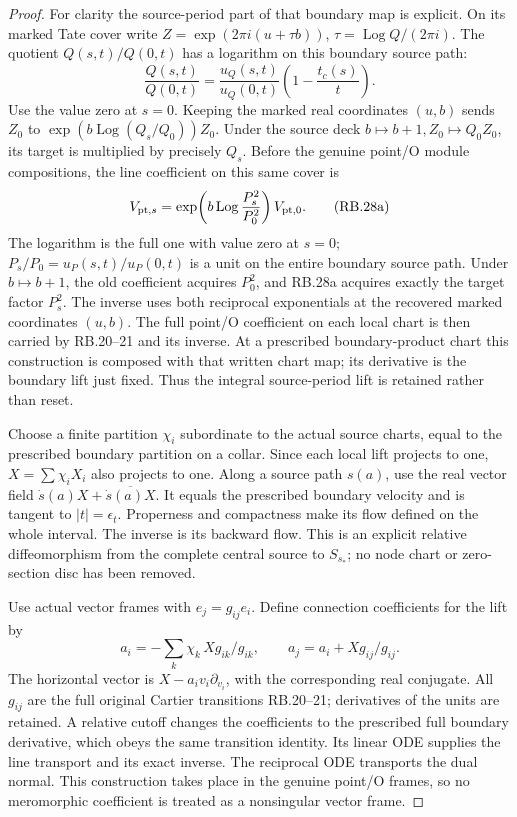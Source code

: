 \begin{proof}
For clarity the source-period part of that boundary map is explicit.
On its marked Tate cover write \(Z=\exp(2\pi i(u+\tau b))\),
\(\tau=\operatorname{Log}Q/(2\pi i)\). The quotient
\(Q(s,t)/Q(0,t)\) has a logarithm on this boundary source path:
\[
 \frac{Q(s,t)}{Q(0,t)}=
 \frac{u_Q(s,t)}{u_Q(0,t)}\left(1-\frac{t_c(s)}t\right).
 \tag{RB.28}
\]
Use the value zero at \(s=0\). Keeping the marked real coordinates
\((u,b)\) sends \(Z_0\) to
\(\exp(b\operatorname{Log}(Q_s/Q_0))Z_0\). Under the source
deck \(b\mapsto b+1,Z_0\mapsto Q_0Z_0\), its target is multiplied
by precisely \(Q_s\). Before the genuine point/O module
compositions, the line coefficient on this same cover is
\[
 V_{{\rm pt},s}=\exp\!\left(
      b\operatorname{Log}\frac{P_s^2}{P_0^2}\right)V_{{\rm pt},0}.
 \tag{RB.28a}
\]
The logarithm is the full one with value zero at \(s=0\);
\(P_s/P_0=u_P(s,t)/u_P(0,t)\) is a unit on the entire boundary
source path. Under \(b\mapsto b+1\), the old coefficient acquires
\(P_0^2\), and RB.28a acquires exactly the target factor
\(P_s^2\). The inverse uses both reciprocal exponentials at the
recovered marked coordinates \((u,b)\). The full point/O coefficient on each local
chart is then carried by RB.20--21 and its inverse. At a prescribed
boundary-product chart this construction is composed with that
written chart map; its derivative is the boundary lift just fixed.
Thus the integral source-period lift is retained rather than reset.

Choose a finite partition \(\chi_i\) subordinate to the actual
source charts, equal to the prescribed boundary partition on a
collar. Since each local lift projects to one,
\(X=\sum\chi_iX_i\) also projects to one. Along a source path
\(s(a)\), use the real vector field
\(\dot s(a)X+\overline{\dot s(a)X}\). It equals the prescribed
boundary velocity and is tangent to \(|t|=\epsilon_t\).
Properness and compactness make its flow defined on the whole
interval. The inverse is its backward flow. This is an explicit
relative diffeomorphism from the complete central source to
\(S_{s_*}\); no node chart or zero-section disc has been removed.

Use actual vector frames with \(e_j=g_{ij}e_i\). Define connection
coefficients for the lift by
\[
 a_i=-\sum_k\chi_k\,Xg_{ik}/g_{ik},\qquad
 a_j=a_i+Xg_{ij}/g_{ij}.
 \tag{RB.29}
\]
The horizontal vector is \(X-a_iv_i\partial_{v_i}\), with the
corresponding real conjugate. All \(g_{ij}\) are the full original
Cartier transitions RB.20--21; derivatives of the units are retained.
A relative cutoff changes the coefficients to the prescribed full
boundary derivative, which obeys the same transition identity.
Its linear ODE supplies the line transport and its exact inverse.
The reciprocal ODE transports the dual normal. This construction
takes place in the genuine point/O frames, so no meromorphic
coefficient is treated as a nonsingular vector frame.


\end{proof}

